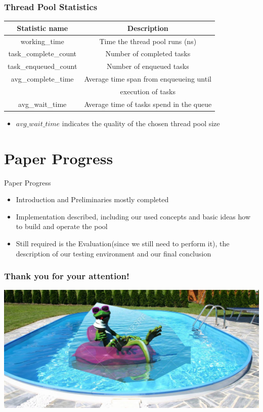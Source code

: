 \documentclass{beamer}
\begin{document}
\begin{frame}
	\frametitle{Thread Pool Statistics}
	\begin{center}
		\begin{tabular}{ c c }
			\hline
			\textbf{Statistic name}&\textbf{Description}\\
			\hline
			working\_time & Time the thread pool runs (ns) \\
			task\_complete\_count & Number of completed tasks \\
			task\_enqueued\_count & Number of enqueued tasks \\
			avg\_complete\_time & Average time span from enqueueing until \\
			& execution of tasks \\
			avg\_wait\_time & Average time of tasks spend in the queue \\
			\hline
		\end{tabular}
		\label{tab4}
	\end{center}
	\begin{itemize}
		\item $avg\_wait\_time$ indicates the quality of the chosen thread pool size
	\end{itemize}
\end{frame}

\section{Paper Progress}
\begin{frame}
	\begin{center}
	\huge Paper Progress \normalsize	
	\end{center}
\end{frame}

\begin{frame}
	\begin{itemize}
		\item Introduction and Preliminaries mostly completed
		\item Implementation described, including our used concepts and basic ideas how to build and operate the pool
		\item Still required is the Evaluation(since we still need to perform it), the description of our testing environment and our final conclusion
	\end{itemize}
\end{frame}

\begin{frame}
    \frametitle{Thank you for your attention!}
 	\includegraphics[width=\textwidth]{img/important.jpg}
\end{frame}
\end{document}
